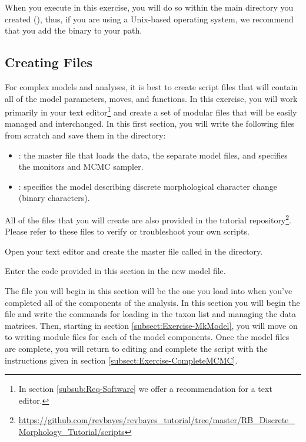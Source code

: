 When you execute \RevBayes in this exercise, you will do so within the main directory you created (), thus, if you are using a Unix-based operating system, we recommend that you add the \RevBayes binary to your path.
\bigskip

\subsection{Creating \Rev Files}\label{subsect:Exercise-CreatingFiles}

For complex models and analyses, it is best to create \Rev script files that will contain all of the model parameters, moves, and functions. 
In this exercise, you will work primarily in your text editor\footnote{In section \ref{subsub:Req-Software} we offer a recommendation for a text editor.} and create a set of modular files that will be easily managed and interchanged.
In this first section, you will write the following files from scratch and save them in the  directory:
\begin{itemize}[noitemsep,topsep=0pt]
\item {}: the master \Rev file that loads the data, the separate model files, and specifies the monitors and MCMC sampler.
\item {}: specifies the model describing discrete morphological character change (binary characters). 
\end{itemize}

All of the files that you will create are also provided in the \RevBayes tutorial repository\footnote{\url{https://github.com/revbayes/revbayes_tutorial/tree/master/RB_Discrete_Morphology_Tutorial/scripts}}. 
Please refer to these files to verify or troubleshoot your own scripts. 

{\begin{framed}
Open your text editor and create the master \Rev file called {\textcolor{red}{}} in the  directory.

Enter the \Rev code provided in this section in the new model file.
\end{framed}}

The file you will begin in this section will be the one you load into \RevBayes when you've completed all of the components of the analysis.
In this section you will begin the file and write the \Rev commands for loading in the taxon list and managing the data matrices.
Then, starting in section \ref{subsect:Exercise-MkModel}, you will move on to writing module files for each of the model components. 
Once the model files are complete, you will return to editing  and complete the \Rev script with the instructions given in section \ref{subsect:Exercise-CompleteMCMC}.

